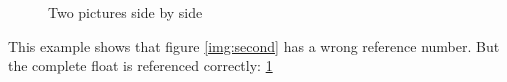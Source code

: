 \documentclass[captions=figureheading]{scrartcl}
\begin{document}
    \begin{figure}
        \centering
        \caption{Two pictures side by side}
        \label{img:both}
    \end{figure}

    This example shows that figure \ref{img:second} has a wrong reference number.
    But the complete float is referenced correctly: \ref{img:both}
\end{document}
